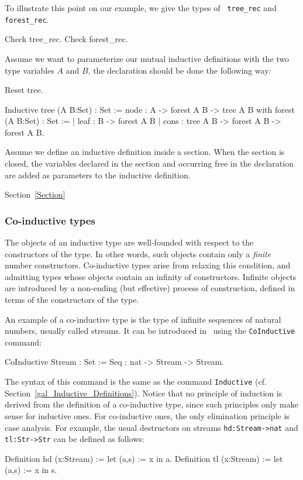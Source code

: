 To illustrate this point on our example, we give the types of {\tt
  tree\_rec} and {\tt forest\_rec}.

\begin{coq_example}
Check tree_rec.
Check forest_rec.
\end{coq_example}

Assume we want to parameterize our mutual inductive definitions with
the two type variables $A$ and $B$, the declaration should be done the
following way:

\begin{coq_eval}
Reset tree.
\end{coq_eval}
\begin{coq_example*}
Inductive tree (A B:Set) : Set :=
    node : A -> forest A B -> tree A B
with forest (A B:Set) : Set :=
  | leaf : B -> forest A B
  | cons : tree A B -> forest A B -> forest A B.
\end{coq_example*}

Assume we define an inductive definition inside a section.  When the
section is closed, the variables declared in the section and occurring
free in the declaration are added as parameters to the inductive
definition. 

\SeeAlso Section~\ref{Section}

\subsubsection{Co-inductive types
\label{CoInductiveTypes}
}

The objects of an inductive type are well-founded with respect to the
constructors of the type. In other words, such objects contain only a
{\it finite} number constructors. Co-inductive types arise from
relaxing this condition, and admitting types whose objects contain an
infinity of constructors. Infinite objects are introduced by a
non-ending (but effective) process of construction, defined in terms
of the constructors of the type.

An example of a co-inductive type is the type of infinite sequences of
natural numbers, usually called streams. It can be introduced in \Coq\
using the \texttt{CoInductive} command:
\begin{coq_example}
CoInductive Stream : Set :=
    Seq : nat -> Stream -> Stream.
\end{coq_example}

The syntax of this command is the same as the command \texttt{Inductive}
(cf. Section~\ref{gal_Inductive_Definitions}). Notice that no
principle of induction is derived from the definition of a
co-inductive type, since such principles only make sense for inductive
ones. For co-inductive ones, the only elimination principle is case
analysis. For example, the usual destructors on streams
\texttt{hd:Stream->nat} and \texttt{tl:Str->Str} can be defined as
follows:
\begin{coq_example}
Definition hd (x:Stream) := let (a,s) := x in a.
Definition tl (x:Stream) := let (a,s) := x in s.
\end{coq_example}

